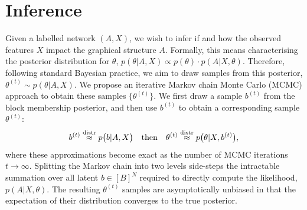\section{Inference}
\label{sec:inference}

Given a labelled network $(A, X)$, we wish to infer if and how the observed features $X$ impact the graphical structure $A$. Formally,
this means characterising the posterior distribution for $\theta$,
$
p(\theta|A, X) \propto p(\theta) \cdot p(A | X, \theta).
$
Therefore, following standard Bayesian practice,
we aim to draw samples from this posterior,
$
	\label{eqn:theta-target}
	\theta^{(t)} \sim p(\theta | A, X).
$
We propose an iterative Markov chain Monte Carlo
(MCMC) approach to obtain these samples
$\{\theta^{(t)}\}$. We first draw a sample $b^{(t)}$ 
from the block membership posterior,
and then use $b^{(t)}$ to obtain a corresponding
sample $\theta^{(t)}$:
%
\begin{equation}
	b^{(t)} \stackrel{\rm distr}{\approx} p \big( b | A, X \big) 
	\quad \textrm{then} \quad
	\theta^{(t)} \stackrel{\rm distr}{\approx} 
	p\big(\theta | X, b^{(t)} \big),
\end{equation}
%
where these approximations become exact as
the number of MCMC iterations $t\to\infty$.
Splitting the Markov chain into two levels side-steps the intractable summation over
all latent $b \in [B]^N$ required to directly compute the likelihood, $p(A| X, \theta)$.
The resulting $\theta^{(t)}$ samples are asymptotically
unbiased in that the expectation of 
their distribution converges to the true posterior.
%
